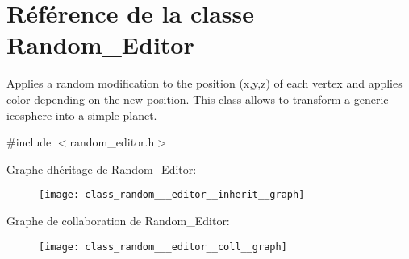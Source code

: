 \hypertarget{class_random___editor}{}\section{Référence de la classe Random\+\_\+\+Editor}
\label{class_random___editor}


Applies a random modification to the position (x,y,z) of each vertex and applies color depending on the new position. This class allows to transform a generic icosphere into a simple planet.  




{\ttfamily \#include $<$random\+\_\+editor.\+h$>$}



Graphe d\textquotesingle{}héritage de Random\+\_\+\+Editor\+:\nopagebreak
\begin{figure}[H]
\begin{center}
\leavevmode
\texttt{[image: class\_random\_\_\_editor\_\_inherit\_\_graph]}
\end{center}
\end{figure}


Graphe de collaboration de Random\+\_\+\+Editor\+:\nopagebreak
\begin{figure}[H]
\begin{center}
\leavevmode
\texttt{[image: class\_random\_\_\_editor\_\_coll\_\_graph]}
\end{center}
\end{figure}
